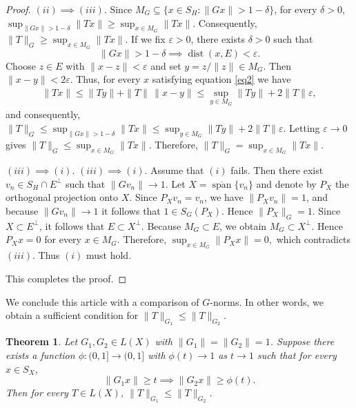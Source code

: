 \documentclass[12pt]{amsart}
\newtheorem{theorem}{Theorem}[section]
\theoremstyle{definition}
\numberwithin{equation}{section}
\begin{document}
\begin{proof}
		
		
		\medskip
		
		\noindent
		$(ii)\implies (iii).$ Since $M_G \subseteq \{x\in S_H:\|Gx\|>1-\delta\}$, for every $\delta>0$, $\sup_{\|Gx\|>1-\delta}\|Tx\|\ge \sup_{x\in M_G}\|Tx\|.$ Consequently, $\|T\|_G \ge \sup_{x\in M_G}\|Tx\|$. If we fix $\varepsilon>0$, there exists $\delta>0$ such that
		\begin{equation}\label{eq2}
			\|Gx\|>1-\delta \implies \operatorname{dist}(x,E)<\varepsilon.
		\end{equation}
		Choose $z\in E$ with $\|x-z\|<\varepsilon$ and set $y=z/\|z\|\in M_G$. Then $\|x-y\|<2\varepsilon$. Thus, for every $x$ satisfying equation \eqref{eq2} we have 
		\begin{align*}
			\|Tx\|\le \|Ty\| + \|T\|\,\|x-y\|\leq \sup_{y\in M_G}\|Ty\|+2\|T\|\varepsilon,
		\end{align*}
		and consequently, $\|T\|_G \le \sup_{\|Gx\|>1-\delta}\|Tx\| \le \sup_{y\in M_G}\|Ty\|+2\|T\|\varepsilon$. Letting $\varepsilon\to0$ gives $\|T\|_G \le \sup_{x\in M_G}\|Tx\|$. Therefore, $\|T\|_G = \sup_{x\in M_G}\|Tx\|$. 
		
		
		\medskip
		
		
		\noindent
		$(iii)\implies (i).$ $(iii)\implies (i)$. Assume that $(i)$ fails. Then there exist $v_n\in S_H\cap E^\perp$ such that $\|Gv_n\|\to1$. Let $X=\overline{\operatorname{span}}\{v_n\}$ and denote by $P_X$ the orthogonal projection onto $X$. Since $P_Xv_n=v_n$, we have $\|P_Xv_n\|=1$, and because $\|Gv_n\|\to1$ it follows that $1\in S_G(P_X)$. Hence $\|P_X\|_G=1$. Since $X \subset E^\perp$, it follows that $E\subset X^\perp$. Because $M_G \subset E$, we obtain $M_G \subset X^\perp$. Hence $P_X x = 0$ for every $x \in M_G$. Therefore, $\sup_{x\in M_G}\|P_Xx\|=0,$ which contradicts $(iii)$. Thus $(i)$ must hold. 
		
		\medskip
		
		This completes the proof.
	\end{proof}
	
	
	We conclude this article with a comparison of $G$-norms. In other words, we obtain a sufficient condition for $\|T\|_{G_1}\le\|T\|_{G_2}$.
	
	
	\begin{theorem}
		Let $G_1, G_2 \in L(X)$ with $\|G_1\| = \|G_2\| = 1$. Suppose there exists a function $\phi : (0, 1] \to (0, 1]$ with $\phi(t) \to 1$ as $t \to 1$ such that for every $x \in S_X$,
		\[
		\|G_1x\| \ge t \implies \|G_2x\| \ge \phi(t).
		\]
		Then for every $T \in L(X)$, $\|T\|_{G_1} \le \|T\|_{G_2}$.
	\end{theorem}
	
\end{document}
